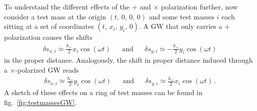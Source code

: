 To understand the different effects of the $+$ and $\times$ polarization further, now consider a test mass at the origin $(t, \, 0, \, 0, \, 0)$ and some test masses $i$ each sitting at a set of coordinates $(t, \, x_i, \, y_i, \, 0)$. A \ac{GW} that only carries a $+$ polarization causes the shifts
\begin{align}
	\delta s_{x,i} \simeq \frac{h_+}{2} x_i \cos(\omega t) &&\text{and} &&\delta s_{y,i} \simeq -\frac{h_+}{2}  y_i  \cos(\omega t)
\end{align}
in the proper distance. Analogously, the shift in proper distance induced through a $\times$-polarized \ac{GW} reads
\begin{align}
	\delta s_{x,i} \simeq \frac{h_\times}{2} y_i \cos(\omega t)&&\text{and} && \delta s_{y,i} \simeq \frac{h_\times}{2} x_i  \cos(\omega t) \, .
\end{align}
A sketch of these effects on a ring of test masses can be found in fig.~\ref{fig:testmassesGW}.

